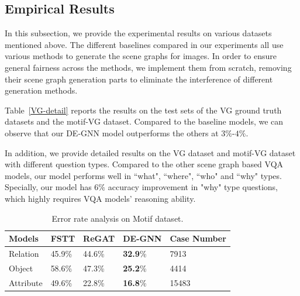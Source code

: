 \documentclass[letterpaper]{article} %
\begin{document}
\subsection{Empirical Results}
In this subsection, we provide the experimental results on various datasets mentioned above. 
The different baselines compared in our experiments all use various methods to generate the scene graphs for images. 
In order to ensure general fairness across the methods, we implement them from scratch, removing their scene graph generation parts to eliminate the interference of different generation methods.

Table~\ref{VG-detail} reports the results on the test sets of the VG ground truth datasets and the motif-VG dataset. Compared to the baseline models, we can observe that our DE-GNN model outperforms the others at $3\%$-$4\%$. 

In addition, we provide detailed results on the VG dataset and motif-VG dataset with different question types. Compared to the other scene graph based VQA models, our model performs well in ``what", ``where", ``who" and ``why" types. Specially, our model has $6\%$ accuracy improvement in "why" type questions, which highly requires VQA models' reasoning ability.


\begin{table}
    \begin{tabular}{llll|l}
    \hline
     \textbf{Models} & FSTT & ReGAT & DE-GNN & Case Number \\
    \hline
     Relation & 45.9\% & 44.6\% & \textbf{32.9}\% & 7913\\
     Object &58.6\% & 47.3\% & \textbf{25.2}\% & 4414\\
     Attribute & 49.6\% & 22.8\% & \textbf{16.8}\% & 15483\\
    \hline
    \end{tabular}
\caption{\label{badcase}
Error rate analysis on Motif dataset. 
}
\end{table} 
\end{document}
